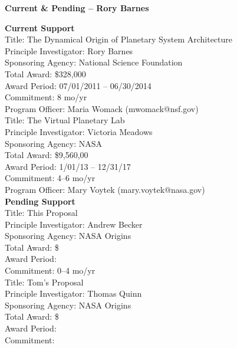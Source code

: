 \documentclass[12pt]{article}
\begin{document}
\begin{center}\Large{\bf Current \& Pending -- Rory Barnes}\end{center}

\noindent\textbf{Current Support}\\

\noindent Title: The Dynamical Origin of Planetary System Architecture\\
Principle Investigator: Rory Barnes\\
Sponsoring Agency: National Science Foundation\\
Total Award: \$328,000\\
Award Period: 07/01/2011 -- 06/30/2014\\
Commitment: 8 mo/yr\\
Program Officer: Maria Womack (mwomack@nsf.gov)\\

\noindent Title: The Virtual Planetary Lab\\
Principle Investigator: Victoria Meadows\\
Sponsoring Agency: NASA\\
Total Award: \$9,560,00\\
Award Period: 1/01/13 -- 12/31/17\\
Commitment: 4--6 mo/yr\\
Program Officer: Mary Voytek (mary.voytek@nasa.gov)\\

\noindent \textbf{Pending Support}\\

\noindent Title: This Proposal\\
Principle Investigator: Andrew Becker\\
Sponsoring Agency: NASA Origins \\
Total Award: \$ \\
Award Period: \\
Commitment: 0--4 mo/yr\\

\noindent Title: Tom's Proposal\\
Principle Investigator: Thomas Quinn\\
Sponsoring Agency: NASA Origins\\
Total Award: \$ \\
Award Period: \\
Commitment: \\
\end{document}
